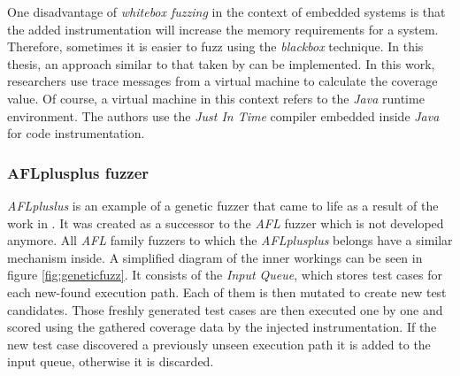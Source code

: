 One disadvantage of \textit{whitebox fuzzing} in the context of embedded systems is that the added instrumentation will increase the memory requirements for a system. Therefore, sometimes it is easier to fuzz using the \textit{blackbox} technique. In this thesis, an approach similar to that taken by \cite{tracecoverage} can be implemented. In this work, researchers use trace messages from a virtual machine to calculate the coverage value. Of course, a virtual machine in this context refers to the \textit{Java} runtime environment. The authors use the \textit{Just In Time} compiler embedded inside \textit{Java} for code instrumentation.

\subsubsection{AFLplusplus fuzzer} \label{sec:afl}

\textit{AFLpluslus} is an example of a genetic fuzzer that came to life as a result of the work in \cite{AFLplusplus-Woot20}. It was created as a successor to the \textit{AFL} fuzzer which is not developed anymore. All \textit{AFL} family fuzzers to which the \textit{AFLplusplus} belongs have a similar mechanism inside. A simplified diagram of the inner workings can be seen in figure \ref{fig:geneticfuzz}. It consists of the \textit{Input Queue}, which stores test cases for each new-found execution path. Each of them is then mutated to create new test candidates. Those freshly generated test cases are then executed one by one and scored using the gathered coverage data by the injected instrumentation. If the new test case discovered a previously unseen execution path it is added to the input queue, otherwise it is discarded.

